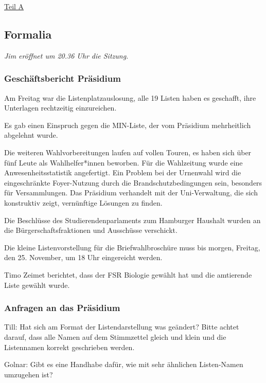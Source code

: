 \documentclass[ngerman,headheight=70pt]{scrartcl}
\begin{document}
    \vspace{0.5cm}
    {\Large \underline{Teil A}}

    \subsection{Formalia}

    \textit{Jim eröffnet um 20.36 Uhr die Sitzung.}

    \subsubsection{Geschäftsbericht Präsidium}

    Am Freitag war die Listenplatzauslosung, alle 19 Listen haben es geschafft,
    ihre Unterlagen rechtzeitig einzureichen.

    Es gab einen Einspruch gegen die MIN-Liste, der vom Präsidium mehrheitlich
    abgelehnt wurde.

    Die weiteren Wahlvorbereitungen laufen auf vollen Touren, es haben sich über
    fünf Leute als Wahlhelfer*innen beworben. Für die Wahlzeitung wurde eine
    Anwesenheitsstatistik angefertigt. Ein Problem bei der Urnenwahl wird die
    eingeschränkte Foyer-Nutzung durch die Brandschutzbedingungen sein, besonders
    für Versammlungen. Das Präsidium verhandelt mit der Uni-Verwaltung, die sich
    konstruktiv zeigt, vernünftige Lösungen zu finden.

    Die Beschlüsse des Studierendenparlaments zum Hamburger Haushalt wurden an
    die Bürgerschaftsfraktionen und Ausschüsse verschickt.

    Die kleine Listenvorstellung für die Briefwahlbroschüre muss bis morgen,
    Freitag, den 25. November, um 18 Uhr eingereicht werden.

    Timo Zeimet berichtet, dass der FSR Biologie gewählt hat und die amtierende
    Liste gewählt wurde.

    \subsubsection{Anfragen an das Präsidium}

    Till: Hat sich am Format der Listendarstellung was geändert? Bitte achtet
    darauf, dass alle Namen auf dem Stimmzettel gleich und klein und die
    Listennamen korrekt geschrieben werden.

    Golnar: Gibt es eine Handhabe dafür, wie mit sehr ähnlichen Listen-Namen
    umzugehen ist?
\end{document}
